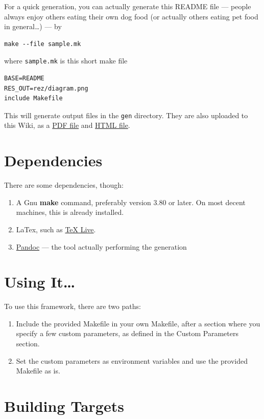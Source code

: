 \documentclass[oneside,]{memoir}
\begin{document}
For a quick generation, you can actually generate this README file ---
people always enjoy others eating their own dog food (or actually others
eating pet food in general\ldots{}) --- by

\begin{verbatim}
make --file sample.mk
\end{verbatim}
where \texttt{sample.mk} is this short make file

\begin{verbatim}
BASE=README
RES_OUT=rez/diagram.png
include Makefile
\end{verbatim}
This will generate output files in the \texttt{gen} directory. They are
also uploaded to this Wiki, as a \href{./gen/README.pdf}{PDF file} and
\href{./gen/README.html}{HTML file}.

\section{Dependencies}

There are some dependencies, though:

\begin{enumerate}[1.]
\item
  A Gnu \textbf{make} command, preferably version 3.80 or later. On most
  decent machines, this is already installed.
\item
  LaTex, such as \href{http://www.tug.org/texlive/}{TeX Live}.
\item
  \href{http://johnmacfarlane.net/pandoc/}{Pandoc} --- the tool actually
  performing the generation
\end{enumerate}
\section{Using It\ldots{}}

To use this framework, there are two paths:

\begin{enumerate}[1.]
\item
  Include the provided Makefile in your own Makefile, after a section
  where you specify a few custom parameters, as defined in the Custom
  Parameters section.
\item
  Set the custom parameters as environment variables and use the
  provided Makefile as is.
\end{enumerate}
\section{Building Targets}
\end{document}
